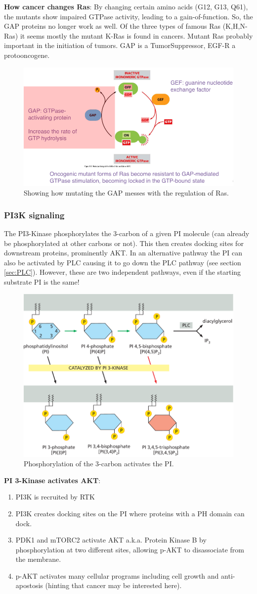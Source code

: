 \documentclass[../main.tex]{subfiles}
\begin{document}
\textbf{How cancer changes Ras}: By changing certain amino acids (G12, G13, Q61), the mutants show impaired GTPase activity, leading to a gain-of-function. So, the GAP proteins no longer work as well. Of the three types of famous Ras (K,H,N-Ras) it seems mostly the mutant K-Ras is found in cancers. Mutant Ras probably important in the initiation of tumors. GAP is a \gls{TumorSuppressor}, EGF-R a \gls{protooncogene}.
\begin{figure}[H]
	\centering
	\includegraphics[height=0.3\textwidth]{Ras_canc}
	\caption{Showing how mutating the GAP messes with the regulation of Ras.}
\end{figure}

\subsubsection{PI3K signaling}

The PI3-Kinase phosphorylates the 3-carbon of a given \gls{PI} molecule (can already be phosphorylated at other carbons or not). This then creates docking sites for downstream proteins, prominently \gls{AKT}. In an alternative pathway the PI can also be activated by \gls{PLC} causing it to go down the PLC pathway (see section \ref{sec:PLC}). However, these are two independent pathways, even if the starting substrate PI is the same!


\begin{figure}[H]
	\centering
	\includegraphics[height=0.3\linewidth]{PI3_phos}
	\caption{Phosphorylation of the 3-carbon activates the PI.}
\end{figure}

\textbf{PI 3-Kinase activates \gls{AKT}}:
\begin{enumerate}
	\item \gls{PI3K} is recruited by RTK
	\item PI3K creates docking sites on the PI where proteins with a PH domain can dock.
	\item \gls{PDK1} and \gls{mTORC2} activate \gls{AKT} a.k.a. Protein Kinase B by phosphorylation at two different sites, allowing p-AKT to disassociate from the membrane.
	\item p-AKT activates many cellular programs including cell growth and anti-apostosis (hinting that cancer may be interested here).
\end{enumerate}
\end{document}
